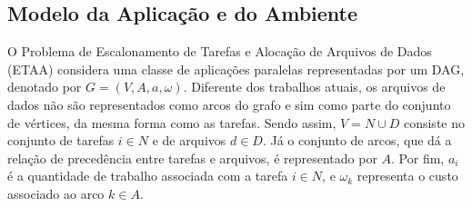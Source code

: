     
    


\subsection{Modelo da Aplicação e do Ambiente} \label{sec:problemDef}

O Problema de Escalonamento de Tarefas e Alocação de Arquivos de Dados (ETAA) considera uma classe de aplicações paralelas representadas por um DAG, denotado por $G =(V, A, a, \omega)$.  Diferente dos trabalhos atuais, os arquivos de dados não são representados como arcos do grafo e sim como parte do conjunto de vértices, da mesma forma como as tarefas. Sendo assim, $V = N \cup D$  consiste no conjunto de tarefas $i \in N$ e de arquivos $d \in D$. Já o conjunto de arcos, que dá a relação de precedência entre tarefas e arquivos, é representado por $A$. Por fim, $a_i$ é a quantidade de trabalho associada com a tarefa $i \in N$, e $\omega_k$ representa o custo associado ao arco $k \in A$. 


